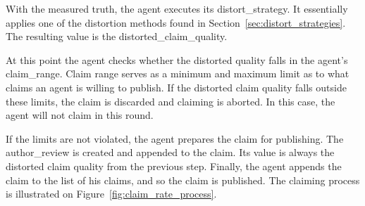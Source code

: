 \documentclass[%
    ]{\PathToTumTemplate/thesis/tum_thesis}
\begin{document}
With the measured truth, the agent executes its \gls{distort_strategy}.
It essentially applies one of the distortion methods found in Section~\ref{sec:distort_strategies}.
The resulting value is the \gls{distorted_claim_quality}.

At this point the agent checks whether the distorted quality falls in the agent's \gls{claim_range}.
Claim range serves as a minimum and maximum limit as to what claims an agent is willing to publish.
If the distorted claim quality falls outside these limits, the claim is discarded and claiming is aborted.
In this case, the agent will not claim in this round.

If the limits are not violated, the agent prepares the claim for publishing.
The \gls{author_review} is created and appended to the claim.
Its value is always the distorted claim quality from the previous step.
Finally, the agent appends the claim to the list of his claims, and so the claim is published.
The claiming process is illustrated on Figure~\ref{fig:claim_rate_process}.
\end{document}
